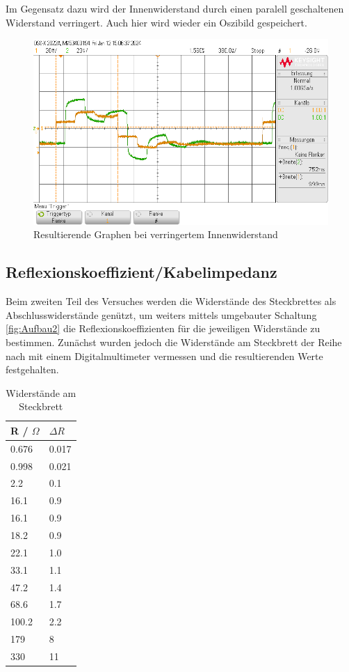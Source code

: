 \documentclass[12pt,a4paper,twoside]{article}
\begin{document}
\noindent
Im Gegensatz dazu wird der Innenwiderstand durch einen paralell geschaltenen Widerstand verringert.
Auch hier wird wieder ein Oszibild gespeichert.

\begin{figure}[H]
    \centering
    \includegraphics[width=0.6\linewidth]{nudes/Messungen/1/c/scope_9.png}
    \caption{Resultierende Graphen bei verringertem Innenwiderstand}
    \label{fig:GraphenB2}
\end{figure}


\subsection{Reflexionskoeffizient/Kabelimpedanz}

Beim zweiten Teil des Versuches werden die Widerstände des Steckbrettes als Abschlusswiderstände genützt, um weiters mittels umgebauter Schaltung \ref{fig:Aufbau2} die Reflexionskoeffizienten für die jeweiligen Widerstände zu bestimmen.
Zunächst wurden jedoch die Widerstände am Steckbrett der Reihe nach mit einem Digitalmultimeter vermessen und die resultierenden Werte festgehalten.

\begin{table}[H]
    \centering
    \caption{Widerstände am Steckbrett}
    \label{tab:Widerstände}
    \begin{tabular}{| l | l |}
        \hline
        R / $\Omega$ & $\Delta R$  \\
        \hline
       0.676 & 0.017 \\
       0.998 & 0.021 \\
         2.2 & 0.1   \\
        16.1 & 0.9   \\
        16.1 & 0.9   \\
        18.2 & 0.9   \\
        22.1 & 1.0   \\
        33.1 & 1.1   \\
        47.2 & 1.4   \\
        68.6 & 1.7   \\
       100.2 & 2.2   \\
         179 & 8     \\
         330 & 11    \\
        \hline
    \end{tabular}
\end{table}
\end{document}
